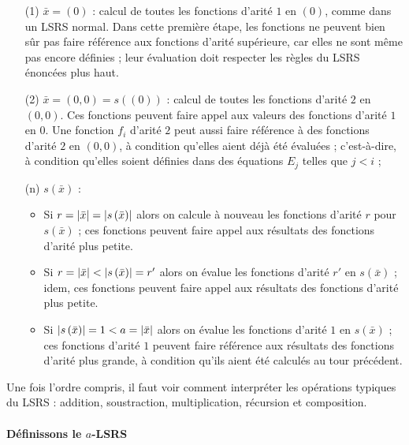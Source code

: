 		\begin{itemize}[itemsep=-1mm]
			\item[(1)] 	
					$\bar{x} = (0)$ : calcul de toutes les fonctions d'arité $1$ en $(0)$, comme dans un LSRS normal. Dans cette première étape, les fonctions ne peuvent bien sûr pas faire référence aux fonctions d'arité supérieure, car elles ne sont même pas encore définies ; leur évaluation doit respecter les règles du LSRS énoncées plus haut. 
					
			\item[(2)] 
					$\bar{x} = (0,0) = s\left( \left( 0 \right)\right)$ : calcul de toutes les fonctions d'arité $2$ en $(0,0)$. Ces fonctions peuvent faire appel aux valeurs des fonctions d'arité $1$ en $0$. Une fonction $f_i$ d'arité $2$ peut aussi faire référence à des fonctions d'arité $2$ en $(0,0)$, à condition qu'elles aient déjà été évaluées ; c'est-à-dire, à condition qu'elles soient définies dans des équations $E_j$ telles que $j<i$ ;
					
			\item[(n)]   	
					$s\left(\bar{x}\right)$ :
					\begin{itemize}[itemsep=-1mm]
						\item 	Si $r = \left|\bar{x}\right| = \left|s\left(\bar{x}\right)\right|$ alors on calcule à nouveau les fonctions d'arité $r$ pour $s\left(\bar{x}\right)$ ; ces fonctions peuvent faire appel aux résultats des fonctions d'arité plus petite. 
						\item 	Si $r = \left|\bar{x}\right| < \left|s\left(\bar{x}\right)\right| = r'$ alors on évalue les fonctions d'arité $r'$ en $s\left(\bar{x}\right)$ ; idem, ces fonctions peuvent faire appel aux résultats des fonctions d'arité plus petite.
						\item 	Si $\left|s\left(\bar{x}\right)\right| = 1 < a = \left|\bar{x}\right|$ alors on évalue les fonctions d'arité $1$ en $s\left(\bar{x}\right)$ ; ces fonctions d'arité $1$ peuvent faire référence aux résultats des fonctions d'arité plus grande, à condition qu'ils aient été calculés au tour précédent. 
					\end{itemize}
		\end{itemize}
		
		Une fois l'ordre compris, il faut voir comment interpréter les opérations typiques du LSRS : addition, soustraction, multiplication, récursion et composition.
	
	
			\paragraph{Définissons le $a$-LSRS}
			
